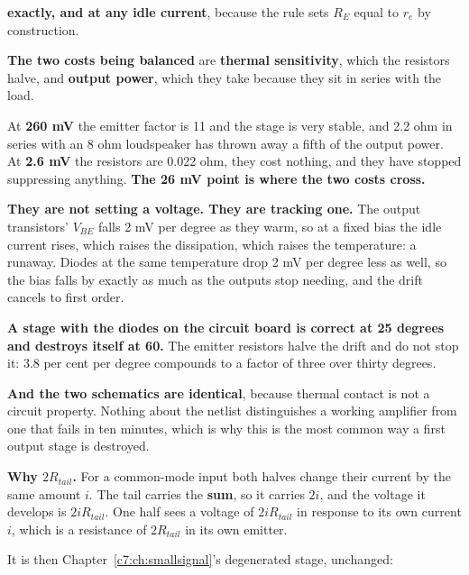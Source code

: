 \textbf{exactly, and at any idle current}, because the rule sets $R_E$ equal to $r_e$ by construction.

\textbf{The two costs being balanced} are \textbf{thermal sensitivity}, which the resistors halve, and \textbf{output power}, which they take because they sit in series with the load.

At \textbf{260 mV} the emitter factor is 11 and the stage is very stable, and 2.2 ohm in series with an 8 ohm loudspeaker has thrown away a fifth of the output power. At \textbf{2.6 mV} the resistors are 0.022 ohm, they cost nothing, and they have stopped suppressing anything. \textbf{The 26 mV point is where the two costs cross.}


\textbf{They are not setting a voltage. They are tracking one.} The output transistors' $V_{BE}$ falls 2 mV per degree as they warm, so at a fixed bias the idle current rises, which raises the dissipation, which raises the temperature: a runaway. Diodes at the same temperature drop 2 mV per degree less as well, so the bias falls by exactly as much as the outputs stop needing, and the drift cancels to first order.

\textbf{A stage with the diodes on the circuit board is correct at 25 degrees and destroys itself at 60.} The emitter resistors halve the drift and do not stop it: 3.8 per cent per degree compounds to a factor of three over thirty degrees.

\textbf{And the two schematics are identical}, because thermal contact is not a circuit property. Nothing about the netlist distinguishes a working amplifier from one that fails in ten minutes, which is why this is the most common way a first output stage is destroyed.



\textbf{Why $2R_{tail}$.} For a common-mode input both halves change their current by the same amount $i$. The tail carries the \textbf{sum}, so it carries $2i$, and the voltage it develops is $2iR_{tail}$. One half sees a voltage of $2iR_{tail}$ in response to its own current $i$, which is a resistance of $2R_{tail}$ in its own emitter.

It is then Chapter~\ref{c7:ch:smallsignal}'s degenerated stage, unchanged:

